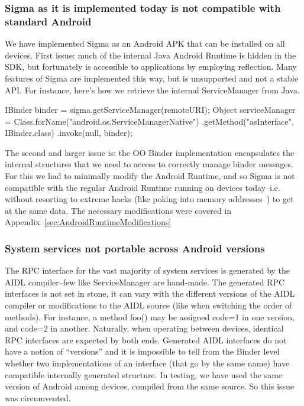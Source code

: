 \documentclass[prodmode]{acmlarge}
\begin{document}
\subsubsection{Sigma as it is implemented today is not compatible with standard Android}
We have implemented Sigma as an Android APK that can be installed on all devices. First issue: much of the internal Java Android Runtime is hidden in the SDK, but fortunately is accessible to applications by employing reflection. Many features of Sigma are implemented this way, but is unsupported and not a stable API. For instance, here's how we retrieve the internal ServiceManager from Java.

\begin{snippet}
IBinder binder = sigma.getServiceManager(remoteURI);
Object serviceManager = Class.forName("android.os.ServiceManagerNative")
                    .getMethod("asInterface", IBinder.class)
                    .invoke(null, binder);
\end{snippet}

The second and larger issue is: the OO Binder implementation encapsulates the internal structures that we need to access to correctly manage binder messages. For this we had to minimally modify the Android Runtime, and so Sigma is not compatible with the regular Android Runtime running on devices today--i.e. without resorting to extreme hacks (like poking into memory addresses~\cite{FacebookDalvikHacks}) to get at the same data. The necessary modifications were covered in Appendix~\ref{sec:AndroidRuntimeModifications}

\subsubsection{System services not portable across Android versions}
The RPC interface for the vast majority of system services is generated by the AIDL compiler--few like ServiceManager are hand-made. The generated RPC interfaces is not set in stone, it can vary with the different versions of the AIDL compiler or modifications to the AIDL source (like when switching the order of methods). For instance, a method foo() may be assigned code=1 in one version, and code=2 in another. Naturally, when operating between devices, identical RPC interfaces are expected by both ends. Generated AIDL interfaces do not have a notion of ``versions'' and it is impossible to tell from the Binder level whether two implementations of an interface (that go by the same name) have compatible internally generated structure. In testing, we have used the same version of Android among devices, compiled from the same source. So this issue was circumvented.
\end{document}
